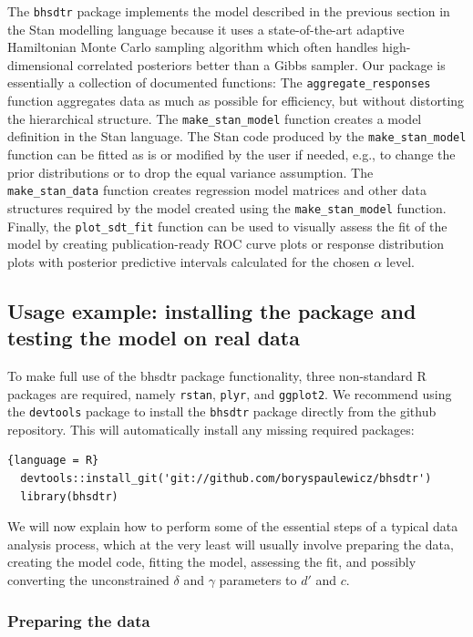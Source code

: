 \documentclass[a4paper,man,apacite,floatsintext]{apa6}
\newcommand{\code}[1]{\texttt{#1}}
\begin{document}
The \code{bhsdtr} package implements the model described in the
previous section in the Stan modelling language because it uses a
state-of-the-art adaptive Hamiltonian Monte Carlo sampling algorithm
which often handles high-dimensional correlated posteriors better than
a Gibbs sampler. Our package is essentially a collection of documented
functions: The \code{aggregate\_responses} function aggregates data as
much as possible for efficiency, but without distorting the
hierarchical structure. The \code{make\_stan\_model} function creates a
model definition in the Stan language. The Stan code produced by the
\code{make\_stan\_model} function can be fitted as is or modified by the
user if needed, e.g., to change the prior distributions or to drop the
equal variance assumption. The \code{make\_stan\_data} function creates
regression model matrices and other data structures required by the
model created using the \code{make\_stan\_model} function. Finally, the
\code{plot\_sdt\_fit} function can be used to visually assess the fit of
the model by creating publication-ready ROC curve plots or response
distribution plots with posterior predictive intervals calculated for
the chosen $\alpha$ level.

\subsection{Usage example: installing the package and testing the
  model on real data}

To make full use of the bhsdtr package functionality, three
non-standard R packages are required, namely \code{rstan},
\code{plyr}, and \code{ggplot2}. We recommend using the
\code{devtools} package to install the \code{bhsdtr} package directly
from the github repository. This will automatically install any
missing required packages:

\begin{lstlisting}{language = R}
  devtools::install_git('git://github.com/boryspaulewicz/bhsdtr')
  library(bhsdtr)
\end{lstlisting}

We will now explain how to perform some of the essential steps of a
typical data analysis process, which at the very least will usually
involve preparing the data, creating the model code, fitting the
model, assessing the fit, and possibly converting the unconstrained
$\delta$ and $\gamma$ parameters to $d'$ and $c$.

\subsubsection{Preparing the data}
\end{document}
